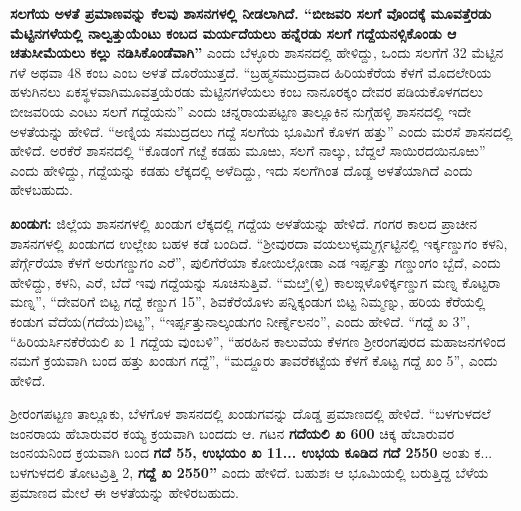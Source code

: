 \vskip 2pt

\textbf{ಸಲಗೆಯ ಅಳತೆ ಪ್ರಮಾಣವನ್ನು ಕೆಲವು ಶಾಸನಗಳಲ್ಲಿ ನೀಡಲಾಗಿದೆ. “ಬೀಜವರಿ ಸಲಗೆ ವೊಂದಕ್ಕೆ ಮೂವತ್ತೆರಡು\general{\break } ಮೆಟ್ಟಿನಗಳೆಯಲ್ಲಿ ನಾಲ್ವತ್ತುಯೆಂಟು ಕಂಬದ ಮರ್ಯದೆಯಲು ಹನ್ನೆರಡು ಸಲಗೆ ಗದ್ದೆಯನಳ್ಸಿಕೊಂಡು ಆ ಚತುಸೀಮೆಯಲು ಕಲ್ಲು ನಡಿಸಿಕೊಂಡೆವಾಗಿ”} ಎಂದು ಬೆಳ್ಳೂರು ಶಾಸನದಲ್ಲಿ ಹೇಳಿದ್ದು, ಒಂದು ಸಲಗೆಗೆ 32 ಮೆಟ್ಟಿನ ಗಳೆ ಅಥವಾ 48 ಕಂಬ ಎಂಬ ಅಳತೆ ದೊರೆಯುತ್ತದೆ. “ಬ್ರಹ್ಮಸಮುದ್ರವಾದ ಹಿರಿಯಕೆರೆಯ ಕೆಳಗೆ ಮೊದಲೇರಿಯ ಹಳುಗಿನಲು ಏಕಸ್ಥಳವಾಗಿ\break ಮೂವತ್ತಯೆರಡು ಮೆಟ್ಟಿನಗಳೆಯಲು ಕಂಬ ನಾನೂರಕ್ಕಂ ದೇವರ ಪಡಿಯಕೊಳಗದಲು ಬೀಜವರಿಯ ಎಂಟು ಸಲಗೆ ಗದ್ದೆಯನು” ಎಂದು ಚನ್ನರಾಯಪಟ್ಟಣ ತಾಲ್ಲೂಕಿನ ನುಗ್ಗೆಹಳ್ಳಿ ಶಾಸನದಲ್ಲಿ ಇದೇ ಅಳತೆಯನ್ನು ಹೇಳಿದೆ. “ಅಣ್ನಿಯ ಸಮುದ್ರ\-ದಲು ಗದ್ದೆ ಸಲಗೆಯ ಭೂಮಿಗೆ ಕೊಳಗ ಹತ್ತು” ಎಂದು ಮರಸೆ ಶಾಸನದಲ್ಲಿ ಹೇಳಿದೆ. ಅರಕೆರೆ ಶಾಸನದಲ್ಲಿ “\hbox{ಕೊಡಂಗೆ} ಗೞ್ದೆ ಕಡಹು ಮೂಱು, ಸಲಗೆ ನಾಲ್ಕು, ಬೆದ್ದಲೆ ಸಾಯಿರದಯಿನೂಱು” ಎಂದು ಹೇಳಿದ್ದು, ಗದ್ದೆಯನ್ನು ಕಡಹು ಲೆಕ್ಕದಲ್ಲಿ ಅಳೆದಿದ್ದು, ಇದು ಸಲಗೆಗಿಂತ ದೊಡ್ಡ ಅಳತೆಯಾಗಿದೆ ಎಂದು ಹೇಳಬಹುದು.

\vskip 2pt

\textbf{ಖಂಡುಗ:} ಜಿಲ್ಲೆಯ ಶಾಸನಗಳಲ್ಲಿ ಖಂಡುಗ ಲೆಕ್ಕದಲ್ಲಿ ಗದ್ದೆಯ ಅಳತೆಯನ್ನು ಹೇಳಿದೆ. ಗಂಗರ ಕಾಲದ ಪ್ರಾಚೀನ ಶಾಸನಗಳಲ್ಲಿ ಖಂಡುಗದ ಉಲ್ಲೇಖ ಬಹಳ ಕಡೆ ಬಂದಿದೆ. “ಶ‍್ರೀವುರದಾ ವಯಲುಳ್ಕಮ್ಮರ್ಗ್ಗಟ್ಟಿನಲ್ಲಿ ಇರ್ಕ್ಕಣ್ಡುಗಂ ಕಳನಿ, ಪೆರ್ಗ್ಗೆರೆಯಾ ಕೆಳಗೆ ಅರುಗಣ್ಡುಗಂ ಎರೆ”, ಪುಲಿಗೆರೆಯಾ ಕೋಯಿಲ್ಗೋಡಾ ಎಡ ಇರ್ಪ್ಪತ್ತು ಗಣ್ಡುಂಗಂ ಬ್ಬೆದೆ, ಎಂದು ಹೇಳಿದ್ದು, ಕಳನಿ, ಎರೆ, ಬೆದೆ ಇವು ಗದ್ದೆಯನ್ನು ಸೂಚಿಸುತ್ತಿವೆ. “ಮೞ್ತಿ(ಳ್ತಿ) ಕಾಲಙ್ಗಳೊಳಿರ್ಕ್ಕಣ್ಡುಗ ಮಣ್ನ ಕೊಟ್ಟರಾ ಮಣ್ನ”, “ದೇವರಿಗೆ ಬಿಟ್ಟ ಗದ್ದೆ ಕಣ್ಡುಗ 15”, ಶಿವಕೆರೆಯೊಳು ಪನ್ನಿಕ್ಕಂಡುಗ ಬಿಟ್ಟ ನಿಮ್ಮಣ್ನು, ಹರಿಯ ಕೆರೆಯಲ್ಲಿ ಕಂಡುಗ \hbox{ವೆದೆಯ}(ಗದೆಯ)ಬಿಟ್ಟ”, “ಇರ್ಪ್ಪತ್ತುನಾಲ್ಕಂಡುಗಂ ನೀರ್ಣ್ನೆಲನಂ”, ಎಂದು ಹೇಳಿದೆ. “ಗದ್ದೆ ಖ 3”, “ಹಿರಿಯರ್ಸಿನಕೆರೆಯಲಿ ಖ 1 ಗದ್ದೆಯ ವುಂಬಳಿ”, “ಹರಹಿನ ಕಾಲುವೆಯ ಕೆಳಗಣ ಶ‍್ರೀರಂಗಪುರದ ಮಹಾಜನಗಳಿಂದ ನಮಗೆ ಕ್ರಯವಾಗಿ ಬಂದ ಹತ್ತು ಖಂಡುಗ ಗದ್ದೆ”, “ಮದ್ದೂರು ತಾವರೆಕಟ್ಟೆಯ ಕೆಳಗೆ ಕೊಟ್ಟ ಗದ್ದೆ ಖಂ 5”, ಎಂದು ಹೇಳಿದೆ.

\vskip 2pt

ಶ‍್ರೀರಂಗಪಟ್ಟಣ ತಾಲ್ಲೂಕು, ಬೆಳಗೊಳ ಶಾಸನದಲ್ಲಿ ಖಂಡುಗವನ್ನು ದೊಡ್ಡ ಪ್ರಮಾಣದಲ್ಲಿ ಹೇಳಿದೆ. “ಬಳಗುಳದಲೆ ಜಂನರಾಯ ಹೆಬಾರುವರ ಕಯ್ಯ ಕ್ರಯವಾಗಿ ಬಂದದು ಆ. ಗಟನ \textbf{ಗದೆಯಲಿ ಖ 600} ಚಿಕ್ಕ ಹೆಬಾರುವರ ಜಂನಯನಿಂದ ಕ್ರಯವಾಗಿ ಬಂದ \textbf{ಗದೆ 55, ಉಭಯಂ ಖ 11... ಉಭಯ ಕೂಡಿದ ಗದೆ 2550} ಅಂತು ಕ... ಬಳಗುಳದಲಿ ತೋಟವ್ರಿತ್ತಿ 2, \textbf{ಗದ್ದೆ ಖ 2550”} ಎಂದು ಹೇಳಿದೆ. ಬಹುಶಃ ಆ ಭೂಮಿಯಲ್ಲಿ ಬರುತ್ತಿದ್ದ ಬೆಳೆಯ ಪ್ರಮಾಣದ ಮೇಲೆ ಈ ಅಳತೆಯನ್ನು ಹೇಳಿರಬಹುದು.

